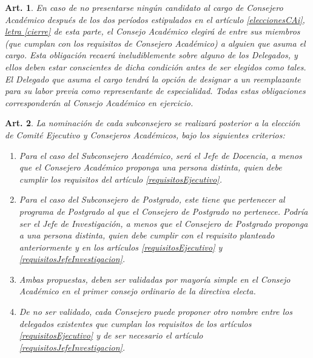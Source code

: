 \documentclass[letterpaper,11pt]{article}
\theoremstyle{plain}
\newtheorem{art}{Art.} %
\newcommand{\aaref}[2]{\hyperref[#2]{\ref*{#1}, letra \ref*{#2}}}
\begin{document}
		\begin{art}\label{eleccionExtraordinariaCAPregrado}
			En caso de no presentarse ningún candidato al cargo de Consejero Académico después de los dos períodos estipulados en el artículo \aaref{eleccionesCAi}{cierre} de esta parte, el Consejo Académico elegirá de entre sus miembros (que cumplan con los requisitos de Consejero Académico) a alguien que asuma el cargo. Esta obligación recaerá ineludiblemente sobre alguno de los Delegados, y ellos deben estar conscientes de dicha condición antes de ser elegidos como tales. El Delegado que asuma el cargo tendrá la opción de designar a un reemplazante para su labor previa como representante de especialidad. Todas estas obligaciones corresponderán al Consejo Académico en ejercicio.
		\end{art}

		\begin{art}\label{nominacionSubconsejeros}
			La nominación de cada subconsejero se realizará posterior a la elección de Comité Ejecutivo y Consejeros Académicos, bajo los siguientes criterios:
			\begin{enumerate}
				\item Para el caso del Subconsejero Académico, será el Jefe de Docencia, a menos que el Consejero Académico proponga una persona distinta, quien debe cumplir los requisitos del artículo \ref{requisitosEjecutivo}.
				
				\item Para el caso del Subconsejero de Postgrado, este tiene que pertenecer al programa de Postgrado al que el Consejero de Postgrado no pertenece. Podría ser el Jefe de Investigación, a menos que el Consejero de Postgrado proponga a una persona distinta, quien debe cumplir con el requisito planteado anteriormente y en los artículos \ref{requisitosEjecutivo} y \ref{requisitosJefeInvestigacion}. 
				
				\item Ambas propuestas, deben ser validadas por mayoría simple en el Consejo Académico en el primer consejo ordinario de la directiva electa.
				
				\item De no ser validado, cada Consejero puede proponer otro nombre entre los delegados existentes que cumplan los requisitos de los artículos \ref{requisitosEjecutivo} y de ser necesario el artículo \ref{requisitosJefeInvestigacion}. 
			\end{enumerate}
		\end{art}
\end{document}
